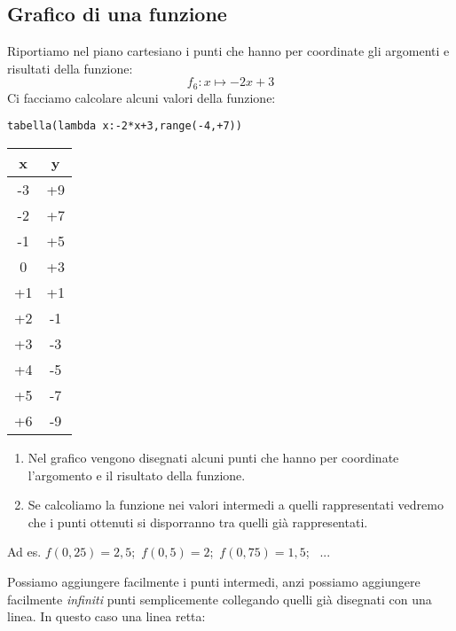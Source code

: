 \subsection{Grafico di una funzione}

Riportiamo nel piano cartesiano i punti che hanno per coordinate gli 
argomenti e risultati della funzione: 
\[f_6: x \mapsto -2x+3\] 
Ci facciamo calcolare alcuni valori della funzione:

\begin{minipage}{.49\textwidth}
\begin{lstlisting}
tabella(lambda x:-2*x+3,range(-4,+7))
\end{lstlisting}
\begin{center}
\begin{tabular}{c|c}
x & y\\\hline
-3 & +9\\
-2 & +7\\
-1 & +5\\
0 & +3\\
+1 & +1\\
+2 & -1\\
+3 & -3\\
+4 & -5\\
+5 & -7\\
+6 & -9
\end{tabular}
\end{center}
\end{minipage}
\begin{minipage}{.49\textwidth}
\begin{center} \scalebox{.7}{\graficoa} \end{center}
\end{minipage}

\begin{minipage}{.49\textwidth}
\begin{osservazione}
\begin{enumerate}
\item Nel grafico vengono disegnati alcuni punti che hanno per coordinate 
l'argomento e il risultato della funzione.
\item Se calcoliamo la funzione nei valori intermedi a quelli rappresentati 
vedremo che i punti ottenuti si disporranno tra quelli già rappresentati. 
\end{enumerate}
\end{osservazione}

Ad es. 
\(f(0,25)=2,5\);~\(f(0,5)=2\);~\(f(0,75)=1,5\);~  ...

Possiamo aggiungere facilmente i punti intermedi, anzi possiamo aggiungere 
facilmente \emph{infiniti} punti semplicemente collegando quelli già 
disegnati con una linea. In questo caso una linea retta:
\end{minipage}
\begin{minipage}{.49\textwidth}
\begin{center} \scalebox{.7}{\graficob} \end{center}
\end{minipage}

